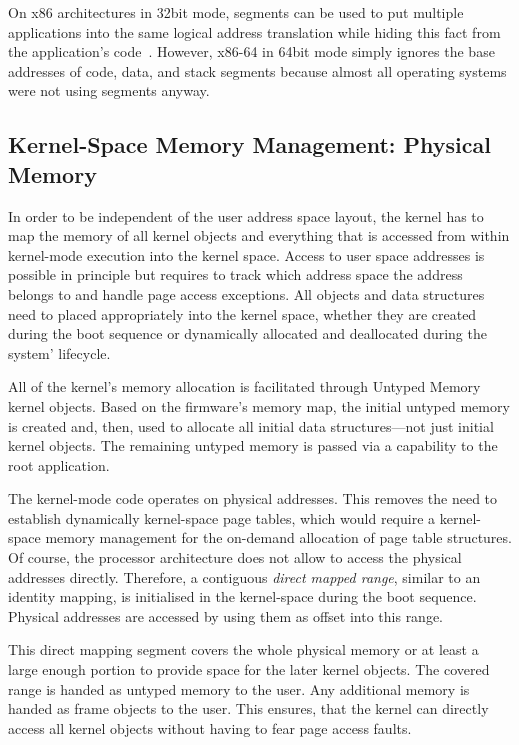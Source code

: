 On x86 architectures in 32bit mode, segments can be used to put multiple applications into the same logical address translation while hiding this fact from the application's code~\cite{SomaGerofiIshikawa2014}. However, x86-64 in 64bit mode simply ignores the base addresses of code, data, and stack segments because almost all operating systems were not using segments anyway.

\subsection{Kernel-Space Memory Management: Physical Memory}
\label{sec:kernel-space-management}
In order to be independent of the user address space layout, the kernel has to map the memory of all kernel objects and everything that is accessed from within kernel-mode execution into the kernel space. Access to user space addresses is possible in principle but requires to track which address space the address belongs to and handle page access exceptions. All objects and data structures need to placed appropriately into the kernel space,  whether they are created during the boot sequence or dynamically allocated and deallocated during the system' lifecycle.

All of the kernel's memory allocation is facilitated through Untyped Memory kernel objects. Based on the firmware's memory map, the initial untyped memory is created and, then, used to allocate all initial data structures---not just initial kernel objects. The remaining untyped memory is passed via a capability to the root application.

The kernel-mode code operates on physical addresses. This removes the need to establish dynamically kernel-space page tables, which would require a kernel-space memory management for the on-demand allocation of page table structures. Of course, the processor architecture does not allow to access the physical addresses directly. Therefore, a contiguous \emph{direct mapped range}, similar to an identity mapping, is initialised in the kernel-space during the boot sequence. Physical addresses are accessed by using them as offset into this range.

This direct mapping segment covers the whole physical memory or at least a large enough portion to provide space for the later kernel objects. The covered range is handed as untyped memory to the user. Any additional memory is handed as frame objects to the user. This ensures, that the kernel can directly access all kernel objects without having to fear page access faults.

